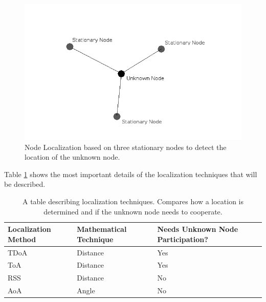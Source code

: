 \begin{figure}[ht]
\centering
\includegraphics[scale=0.5]{img/node-localization-lines.png}
\caption{Node Localization based on three stationary nodes to detect the location of the unknown node.}
\label{fig:node_localization}
\end{figure}\par

Table \ref{table:local_methods} shows the most important details of the localization techniques that will be described. \par
\begin{table}[ht]
\centering
\caption{A table describing localization techniques. Compares how a location is determined and if the unknown node needs to cooperate.}
\label{table:local_methods}
\begin{tabular}{|l|l|l|}
    \hline
  Localization Method   & Mathematical Technique    & Needs Unknown Node Participation? \\ \hline
         TDoA           & Distance                  & Yes                                \\
          ToA           & Distance                  & Yes                                \\
          RSS           & Distance                  & No                                 \\
          AoA           & Angle                     & No                                 \\
    \hline
\end{tabular}
\end{table}\par

